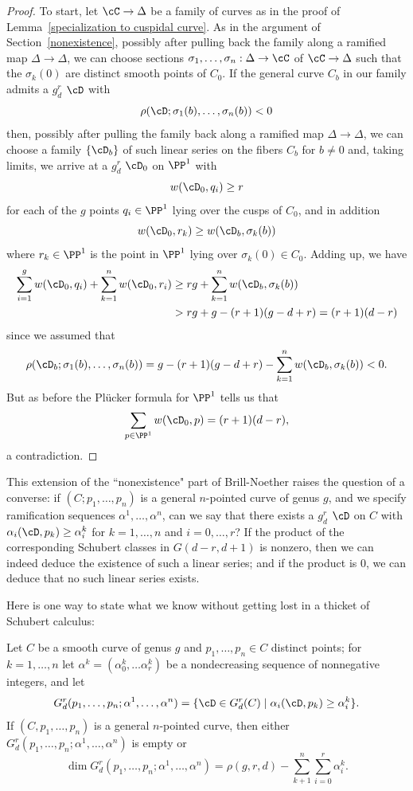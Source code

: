 \begin{proof}
To start, let $\cC \to \Delta$ be a family of curves as in the proof of Lemma~\ref{specialization to cuspidal curve}.
As in the argument of Section~\ref{nonexistence}, possibly
after pulling back the family along a ramified map $\Delta \to \Delta$, we can choose sections $\sigma_1, \dots, \sigma_n : \Delta \to \cC$  of $\cC \to \Delta$ such that the $\sigma_k(0)$ are distinct smooth points of $C_0$.
If the general curve $C_b$ in our family admits a $g^r_d$ $\cD$ with
$$
\rho(\cD;\sigma_1(b),\dots,\sigma_n(b)) < 0
$$
then, possibly after pulling the family back along a ramified map $\Delta \to \Delta$, we can choose a family $\{\cD_b\}$ of such linear series 
on the fibers $C_b$ for $b \neq 0$ and, taking limits, we arrive at a $g^r_d$ $\cD_0$ on $\PP^1$ with
$$
w(\cD_0, q_i) \geq r
$$
for each of the $g$ points $q_i \in \PP^1$ lying over the cusps of $C_0$, and in addition
$$
w(\cD_0, r_k) \geq w(\cD_b,\sigma_k(b))
$$
where $r_k \in \PP^1$ is the point in $\PP^1$ lying over $\sigma_k(0) \in C_0$. Adding up, we have
\begin{align*}
\sum_{i=1}^g w(\cD_0, q_i) + \sum_{k=1}^n w(\cD_0, r_i) &\geq rg + \sum_{k=1}^n w(\cD_b,\sigma_k(b)) \\
&> rg + g - (r+1)(g-d+r) = (r+1)(d-r)
\end{align*}
since we assumed that 
$$
\rho(\cD_b;\sigma_1(b),\dots,\sigma_n(b)) = g - (r+1)(g-d+r) - \sum_{k=1}^n w(\cD_b,\sigma_k(b)) < 0.
$$
But as before the Pl\"ucker formula for $\PP^1$ tells us that
$$
\sum_{p \in \PP^1} w(\cD_0, p) = (r+1)(d-r),
$$
a contradiction.
\end{proof}

This extension of the ``nonexistence" part of Brill-Noether raises the question of a converse: if $(C;p_1,\dots,p_n)$ is a general $n$-pointed curve of genus $g$, and we specify ramification sequences $\alpha^1, \dots, \alpha^n$, can we say that there exists a $g^r_d$ $\cD$ on $C$ with $\alpha_i(\cD, p_k) \geq \alpha^k_i$ for $k=1,\dots,n$ and $i = 0, \dots, r$? If the product of the corresponding Schubert classes in $G(d-r, d+1)$ is nonzero, then we can indeed deduce the existence of such a linear series; and if the product is 0, we can deduce that no such linear series exists.

Here is one way to state what we know without getting lost in a thicket of Schubert calculus:

\begin{theorem}\label{BN with inflection and dimension}
Let $C$ be a smooth curve of genus $g$ and $p_1,\dots,p_n \in C$ distinct points; for $k = 1,\dots,n$ let $\alpha^k = (\alpha^k_0,\dots\alpha^k_r)$ be a nondecreasing sequence of nonnegative integers, and let
$$
G^r_d(p_1,\dots,p_n; \alpha^1,\dots,\alpha^n) = \{\cD \in G^r_d(C) \mid \alpha_i(\cD, p_k) \geq \alpha^k_i \}.
$$
If $(C, p_1,\dots,p_n)$ is a general $n$-pointed curve, then either $G^r_d(p_1,\dots,p_n; \alpha^1,\dots,\alpha^n)$ is empty or
$$
\dim G^r_d(p_1,\dots,p_n; \alpha^1,\dots,\alpha^n) = \rho(g,r,d) - \sum_{k+1}^n \sum_{i=0}^r \alpha^k_i.
$$
\end{theorem}

